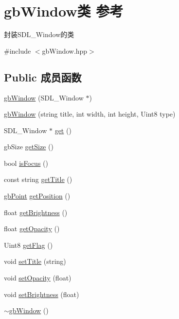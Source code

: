 \hypertarget{classgb_window}{}\section{gb\+Window类 参考}
\label{classgb_window}


封装\+S\+D\+L\+\_\+\+Window的类  




{\ttfamily \#include $<$gb\+Window.\+hpp$>$}

\subsection*{Public 成员函数}
\begin{DoxyCompactItemize}
\item 
\mbox{\hyperlink{classgb_window_a08e5afeb1a8c049610b57be380b6403a}{gb\+Window}} (S\+D\+L\+\_\+\+Window $\ast$)
\item 
\mbox{\hyperlink{classgb_window_adc21ef6f5b7f1231568affe0b4554cd2}{gb\+Window}} (string title, int width, int height, Uint8 type)
\item 
S\+D\+L\+\_\+\+Window $\ast$ \mbox{\hyperlink{classgb_window_a3c898bc79a1a4d09fbdf138ccb25fb88}{get}} ()
\item 
gb\+Size \mbox{\hyperlink{classgb_window_a0a5f9d324a9d81167d9e7b1721587ec4}{get\+Size}} ()
\item 
bool \mbox{\hyperlink{classgb_window_abda1af6601c41ace2731cfeff9312927}{is\+Focus}} ()
\item 
const string \mbox{\hyperlink{classgb_window_a470388bdcea1c7ed3ee77ddb9ecb5a46}{get\+Title}} ()
\item 
\mbox{\hyperlink{classgb_point}{gb\+Point}} \mbox{\hyperlink{classgb_window_a694817c835e86e52cb18c5d70726ca1c}{get\+Position}} ()
\item 
float \mbox{\hyperlink{classgb_window_a285d24584544d223e18078a60882109c}{get\+Brightness}} ()
\item 
float \mbox{\hyperlink{classgb_window_a783ba0e2f72c27f844105909d54b5f5f}{get\+Opacity}} ()
\item 
Uint8 \mbox{\hyperlink{classgb_window_a9da9e2d896d38dd055e6224e168294b6}{get\+Flag}} ()
\item 
void \mbox{\hyperlink{classgb_window_ab7a05f81b0191dbccafc897287d1b759}{set\+Title}} (string)
\item 
void \mbox{\hyperlink{classgb_window_a4a89c22270c639142295477ab37e838f}{set\+Opacity}} (float)
\item 
void \mbox{\hyperlink{classgb_window_ad05c721b3e04f23f0e6b72e4c411be1c}{set\+Brightness}} (float)
\item 
\mbox{\hyperlink{classgb_window_acd0d49bdf1dbe7df86e02ba82a318571}{$\sim$gb\+Window}} ()
\end{DoxyCompactItemize}


